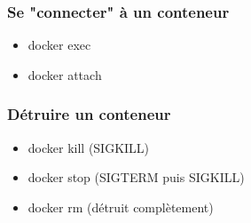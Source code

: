   \begin{frame}
    \frametitle{Se "connecter" à un conteneur}
    \begin{itemize}
      \item docker exec
      \item docker attach
    \end{itemize}
  \end{frame}

  \begin{frame}
    \frametitle{Détruire un conteneur}
    \begin{itemize}
      \item docker kill (SIGKILL)
      \item docker stop (SIGTERM puis SIGKILL)
      \item docker rm (détruit complètement)
    \end{itemize}
  \end{frame}
